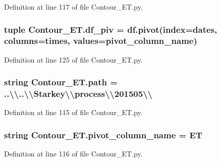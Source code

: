 Definition at line 117 of file Contour\+\_\+\+E\+T.\+py.

\hypertarget{namespace_contour___e_t_afe10e2d562af1d0f4be9cc7b17a68e49}{}
\subsubsection[{df\+\_\+piv}]{\setlength{\rightskip}{0pt plus 5cm}tuple Contour\+\_\+\+E\+T.\+df\+\_\+piv = df.\+pivot(index=\textquotesingle{}dates\textquotesingle{}, columns=\textquotesingle{}times\textquotesingle{}, values={\bf pivot\+\_\+column\+\_\+name})}\label{namespace_contour___e_t_afe10e2d562af1d0f4be9cc7b17a68e49}


Definition at line 125 of file Contour\+\_\+\+E\+T.\+py.

\hypertarget{namespace_contour___e_t_af326a717be24fa633d2faf0eac687552}{}
\subsubsection[{path}]{\setlength{\rightskip}{0pt plus 5cm}string Contour\+\_\+\+E\+T.\+path = \textquotesingle{}..\textbackslash{}\textbackslash{}..\textbackslash{}\textbackslash{}Starkey\textbackslash{}\textbackslash{}process\textbackslash{}\textbackslash{}201505\textbackslash{}\textbackslash{}\textquotesingle{}}\label{namespace_contour___e_t_af326a717be24fa633d2faf0eac687552}


Definition at line 115 of file Contour\+\_\+\+E\+T.\+py.

\hypertarget{namespace_contour___e_t_a1d101debf10ad92d73509b40746b119c}{}
\subsubsection[{pivot\+\_\+column\+\_\+name}]{\setlength{\rightskip}{0pt plus 5cm}string Contour\+\_\+\+E\+T.\+pivot\+\_\+column\+\_\+name = \textquotesingle{}E\+T\textquotesingle{}}\label{namespace_contour___e_t_a1d101debf10ad92d73509b40746b119c}


Definition at line 116 of file Contour\+\_\+\+E\+T.\+py.

